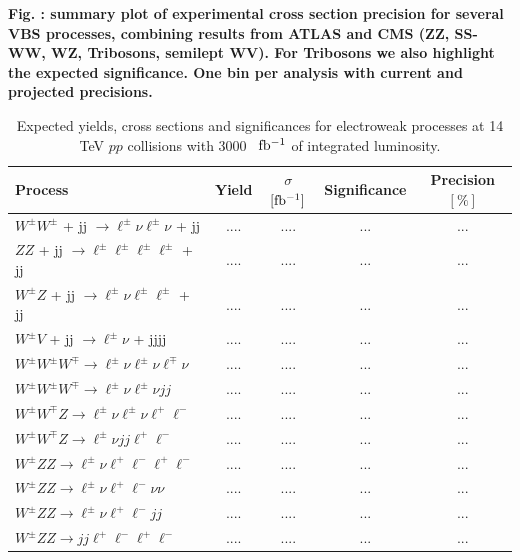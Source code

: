 \documentclass{article}
\newcommand*{\fbinv}{\ensuremath{{\rm fb^{-1}}}\xspace}
\begin{document}
{\bf Fig. : summary plot of experimental cross section precision for several VBS processes, combining results from ATLAS and CMS (ZZ, SS-WW, WZ, Tribosons, semilept WV). For Tribosons we also highlight the expected significance. One bin per analysis with current and projected precisions.}


\begin{table}[htbp]
\caption{Expected yields, cross sections and significances for electroweak processes at 14 TeV $pp$ collisions with 3000~ \fbinv of integrated luminosity.}
\label{tab:yields}
\begin{center}
\begin{tabular}{ | l | c | C | c| c|}
\hline
Process & Yield & $\sigma$ ${\rm [fb^{-1}]}$ & Significance & Precision {\rm $[\%]$} \\
\hline
\hline
$W^\pm W^\pm$ + jj $\to \ell^{\pm}\nu  \ell^{\pm}\nu$ + jj & .... & .... & ... & ...  \\
\hline
$ZZ$ + jj $\to \ell^{\pm}\ell^{\pm}  \ell^{\pm}\ell^{\pm}$ + jj & .... & .... & ...& ...    \\
\hline
$W^\pm Z$ + jj $\to \ell^{\pm}\nu  \ell^{\pm}\ell^{\pm}$ + jj & .... & .... & ...& ...    \\
\hline
$W^\pm V$ + jj $\to \ell^{\pm}\nu$ + jjjj & .... & .... & ... & ...   \\
\hline
\hline 
$W^{\pm} W^{\pm} W^{\mp} \to \ell^{\pm}\nu \ell^{\pm}\nu\ell^{\mp}\nu$ & .... & .... & ... & ...   \\
\hline 
$W^{\pm} W^{\pm} W^{\mp} \to \ell^{\pm}\nu \ell^{\pm}\nu jj$ & .... & .... & ... & ...   \\
\hline
$W^{\pm} W^{\mp} Z \to \ell^{\pm}\nu \ell^{\pm}\nu \ell^+\ell^-$ & .... & .... & ... & ...   \\
\hline 
$W^{\pm} W^{\mp} Z \to \ell^{\pm}\nu jj \ell^+\ell^-$ & .... & .... & ... & ...   \\
\hline
$W^{\pm} Z Z \to \ell^{\pm}\nu \ell^{+}\ell^{-} \ell^{+}\ell^{-}$ & .... & .... & ... & ...   \\
\hline
$W^{\pm} Z Z \to \ell^{\pm}\nu \ell^{+}\ell^{-} \nu\nu$ & .... & .... & ... & ...   \\
\hline 
$W^{\pm} Z Z \to \ell^{\pm}\nu  \ell^{+}\ell^{-} jj$ & .... & .... & ... & ...   \\
\hline 
$W^{\pm} Z Z \to jj \ell^{+}\ell^{-}  \ell^{+}\ell^{-} $ & .... & .... & ... & ...   \\
\hline
\end{tabular}
\end{center}
\end{table}
\end{document}

